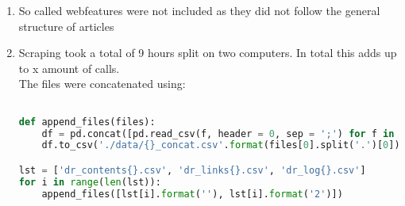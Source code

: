\documentclass[10pt,a4paper]{article}
\author{Sebastian Baltser}
\begin{document}
	\begin{enumerate}
		\item So called webfeatures were not included as they did not follow the general structure of articles
		\item Scraping took a total of 9 hours split on two computers. In total this adds up to x amount of calls.\\
		The files were concatenated using:
\begin{lstlisting}[language=Python]

def append_files(files):
	df = pd.concat([pd.read_csv(f, header = 0, sep = ';') for f in files], axis = 0)
	df.to_csv('./data/{}_concat.csv'.format(files[0].split('.')[0]), index = False) #Save to csv named as the first file with 'concat' appended

lst = ['dr_contents{}.csv', 'dr_links{}.csv', 'dr_log{}.csv']
for i in range(len(lst)):
	append_files([lst[i].format(''), lst[i].format('2')])
\end{lstlisting}
	\end{enumerate}
\end{document}
